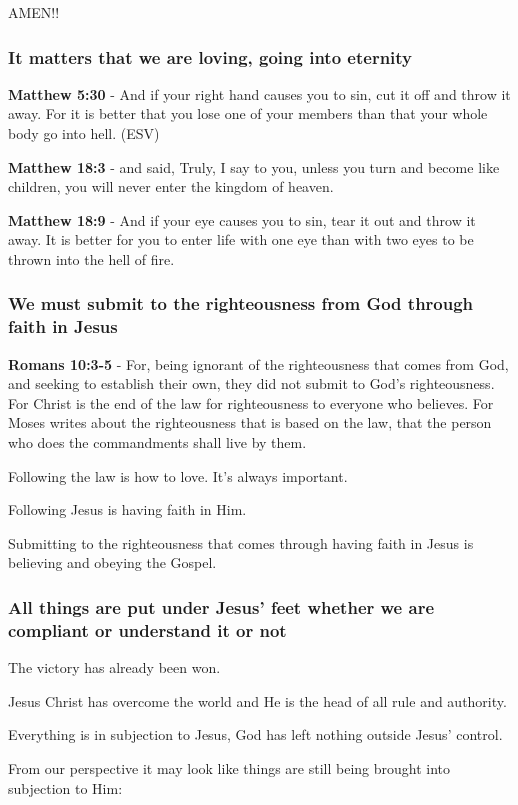 \documentclass[11pt]{article}
\begin{document}
AMEN!!

\subsubsection{It matters that we are loving, going into eternity}
\label{sec:org38a93d9}
\textbf{Matthew 5:30} - And if your right hand causes you to sin, cut it off and throw it away. For it is better that you lose one of your members than that your whole body go into hell. (ESV)

\textbf{Matthew 18:3} - and said, Truly, I say to you, unless you turn and become like children, you will never enter the kingdom of heaven.

\textbf{Matthew 18:9} - And if your eye causes you to sin, tear it out and throw it away. It is better for you to enter life with one eye than with two eyes to be thrown into the hell of fire.

\subsubsection{We must submit to the righteousness from God through faith in Jesus}
\label{sec:org827aa70}
\textbf{Romans 10:3-5} - For, being ignorant of the righteousness that comes from God, and seeking to establish their own, they did not submit to God's righteousness. For Christ is the end of the law for righteousness to everyone who believes. For Moses writes about the righteousness that is based on the law, that the person who does the commandments shall live by them.

Following the law is how to love. It's always important.

Following Jesus is having faith in Him.

Submitting to the righteousness that comes through having faith in Jesus is believing and obeying the Gospel.

\subsubsection{All things \textbf{are} put under Jesus' feet whether we are compliant or understand it or not}
\label{sec:orge3ecac2}
The victory has already been won.

Jesus Christ has overcome the world and He is the head of all rule and authority.

Everything is in subjection to Jesus, God has left nothing outside Jesus' control.

From our perspective it may look like things are still being brought into subjection to Him:
\end{document}
